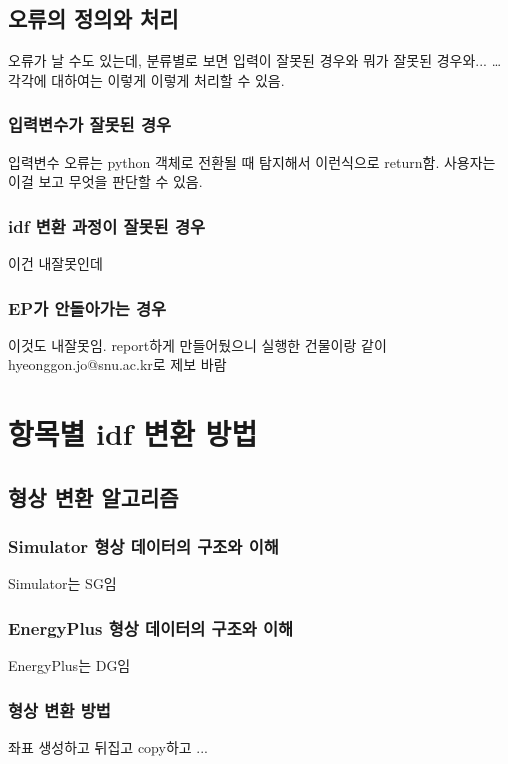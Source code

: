 \section{오류의 정의와 처리}
오류가 날 수도 있는데, 분류별로 보면 입력이 잘못된 경우와 뭐가 잘못된 경우와... \dots
각각에 대하여는 이렇게 이렇게 처리할 수 있음.
\subsection{입력변수가 잘못된 경우}
입력변수 오류는 python 객체로 전환될 때 탐지해서 이런식으로 return함. 사용자는 이걸 보고 무엇을 판단할 수 있음.
\subsection{idf 변환 과정이 잘못된 경우}
이건 내잘못인데
\subsection{EP가 안돌아가는 경우}
이것도 내잘못임. report하게 만들어뒀으니 실행한 건물이랑 같이 hyeonggon.jo@snu.ac.kr로 제보 바람


\chapter{항목별 idf 변환 방법}

\section{형상 변환 알고리즘}
\subsection{Simulator 형상 데이터의 구조와 이해}
Simulator는 SG임

\subsection{EnergyPlus 형상 데이터의 구조와 이해}
EnergyPlus는 DG임

\subsection{형상 변환 방법}
좌표 생성하고 뒤집고 copy하고 ...

